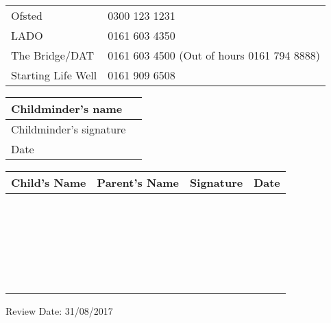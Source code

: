 \begin{table}[h]
  \begin{tabularx}{\textwidth}{lX}
    Ofsted & 0300 123 1231 \\
    LADO & 0161 603 4350 \\
    The Bridge/DAT & 0161 603 4500 (Out of hours 0161 794 8888) \\
    Starting Life Well & 0161 909 6508 \\ 
 \end{tabularx}
\end{table}

\begin{table}[h]
  \def\arraystretch{2.0}
  \begin{tabularx}{\textwidth}{|l|X|}
    \hline
    Childminder's name & \\
    \hline
    Childminder's signature &  \\
    \hline
    Date & \\
    \hline
  \end{tabularx}
\end{table}

\begin{table}[H]
  \def\arraystretch{2.0}
  \begin{tabularx}{\textwidth}{|X|X|X|X|}
    \hline
    Child's Name & Parent's Name & Signature & Date \\
    \hline
    ~ & ~ & ~ & \\
    \hline
    ~ & ~ & ~ & \\
    \hline
    ~ & ~ & ~ & \\
    \hline
    ~ & ~ & ~ & \\
    \hline
    ~ & ~ & ~ & \\
    \hline
  \end{tabularx}
\end{table}

Review Date: 31/08/2017


